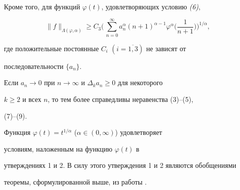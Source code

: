 \begin{assrt}
Кроме того, для функций $\varphi(t)$, удовлетворяющих условию {\em (6)},


\begin{equation}


\|f\|_{\Lambda(\varphi,\alpha)}\ge C_3\biggl(\,


\sum^\infty_{n=0}a^\alpha_n (n+1)^{\alpha-1}


\varphi^\alpha\biggl(\frac{1}{n+1} \biggr)\biggr)^{1/\alpha},


\end{equation}


где положительные постоянные $C_i$ $(i=\overline{1,3})$ не зависят от


последовательности $\{a_n\}$.


\end{assrt}





\begin{note}


Если $a_n\to 0$ при $n\to\infty$ и $\Delta_k a_n\ge 0$ для некоторого


$k\ge 2$ и всех $n$, то тем более справедливы неравенства (3)--(5),


(7)--(9).


\end{note}





\begin{note}


Функция $\varphi(t)=t^{1/\alpha}$ ($\alpha\in(0,\infty)$) удовлетворяет


условиям, наложенным на функцию $\varphi(t)$ в


утверждениях 1 и 2. В силу этого утверждения 1 и 2 являются обобщениями


теоремы, сформулированной выше, из работы \cite{2}.


\end{note}






